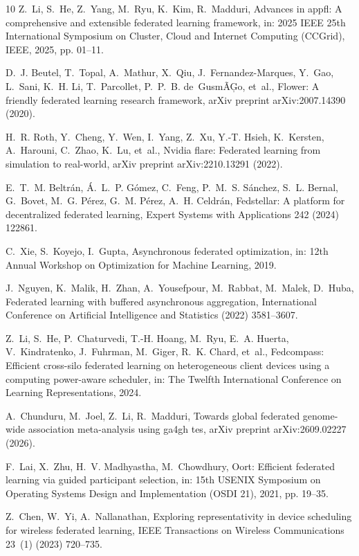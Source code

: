 \documentclass[preprint,12pt, a4paper]{elsarticle}
\begin{document}
\begin{thebibliography}{10}
Z.~Li, S.~He, Z.~Yang, M.~Ryu, K.~Kim, R.~Madduri, Advances in appfl: A comprehensive and extensible federated learning framework, in: 2025 IEEE 25th International Symposium on Cluster, Cloud and Internet Computing (CCGrid), IEEE, 2025, pp. 01--11.

D.~J. Beutel, T.~Topal, A.~Mathur, X.~Qiu, J.~Fernandez-Marques, Y.~Gao, L.~Sani, K.~H. Li, T.~Parcollet, P.~P.~B. de~Gusm{\~A}{\c{G}}o, et~al., Flower: A friendly federated learning research framework, arXiv preprint arXiv:2007.14390 (2020).

H.~R. Roth, Y.~Cheng, Y.~Wen, I.~Yang, Z.~Xu, Y.-T. Hsieh, K.~Kersten, A.~Harouni, C.~Zhao, K.~Lu, et~al., Nvidia flare: Federated learning from simulation to real-world, arXiv preprint arXiv:2210.13291 (2022).

E.~T.~M. Beltr{\'a}n, {\'A}.~L.~P. G{\'o}mez, C.~Feng, P.~M.~S. S{\'a}nchez, S.~L. Bernal, G.~Bovet, M.~G. P{\'e}rez, G.~M. P{\'e}rez, A.~H. Celdr{\'a}n, Fedstellar: A platform for decentralized federated learning, Expert Systems with Applications 242 (2024) 122861.

C.~Xie, S.~Koyejo, I.~Gupta, Asynchronous federated optimization, in: 12th Annual Workshop on Optimization for Machine Learning, 2019.

J.~Nguyen, K.~Malik, H.~Zhan, A.~Yousefpour, M.~Rabbat, M.~Malek, D.~Huba, Federated learning with buffered asynchronous aggregation, International Conference on Artificial Intelligence and Statistics (2022) 3581--3607.

Z.~Li, S.~He, P.~Chaturvedi, T.-H. Hoang, M.~Ryu, E.~A. Huerta, V.~Kindratenko, J.~Fuhrman, M.~Giger, R.~K. Chard, et~al., Fedcompass: Efficient cross-silo federated learning on heterogeneous client devices using a computing power-aware scheduler, in: The Twelfth International Conference on Learning Representations, 2024.

A.~Chunduru, M.~Joel, Z.~Li, R.~Madduri, Towards global federated genome-wide association meta-analysis using ga4gh tes, arXiv preprint arXiv:2609.02227 (2026).

F.~Lai, X.~Zhu, H.~V. Madhyastha, M.~Chowdhury, Oort: Efficient federated learning via guided participant selection, in: 15th USENIX Symposium on Operating Systems Design and Implementation (OSDI 21), 2021, pp. 19--35.

Z.~Chen, W.~Yi, A.~Nallanathan, Exploring representativity in device scheduling for wireless federated learning, IEEE Transactions on Wireless Communications 23~(1) (2023) 720--735.

\end{thebibliography}
\end{document}
